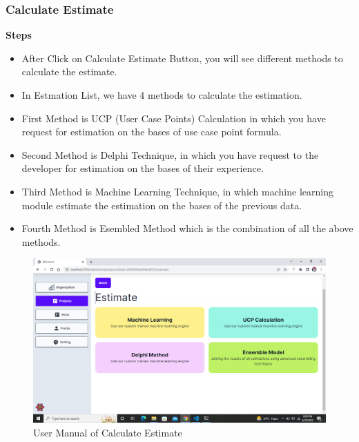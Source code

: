 \subsubsection{Calculate Estimate}
\textbf{Steps}
\begin{itemize}
    \item After Click on Calculate Estimate Button, you will see different methods to calculate the estimate.
    \item In Estmation List, we have 4 methods to calculate the estimation.
    \item First Method is UCP (User Case Points) Calculation in which you have request for estimation on the bases of use case point formula.
    \item Second Method is Delphi Technique, in which you have request to the developer for estimation on the bases of their experience.
    \item Third Method is Machine Learning Technique, in which machine learning module estimate the estimation on the bases of the previous data.
    \item Fourth Method is Esembled Method which is the combination of all the above methods.
\end{itemize}

\begin{figure}[H]
    \centering
    \includegraphics[scale=0.4]{./diagrams/user-manual/Screenshot (32).png}
    \caption{User Manual of Calculate Estimate}
    \label{fig:user-1}

\end{figure}

